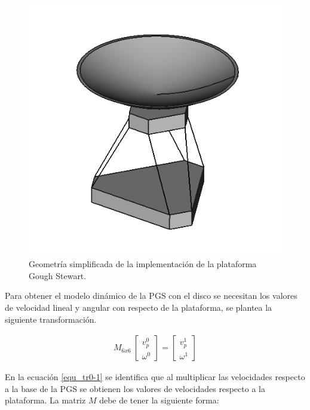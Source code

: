 \begin{figure}
 \centering
 \includegraphics[scale=0.6]{img/implementation.png}
 \caption{Geometría simplificada de la implementación de la plataforma Gough Stewart.}
 \label{fig: antenna}
\end{figure}


Para obtener el modelo dinámico de la PGS con el 
disco se necesitan los valores de velocidad lineal y 
angular con respecto de la plataforma, se plantea la 
siguiente transformación.

\begin{equation} \label{equ_tr0-1}
\begin{split}
M_{6x6}\
\begin{bmatrix}
v_p^0\\
\omega^0
\end{bmatrix}  = \begin{bmatrix}
v_p^1\\
\omega^1
\end{bmatrix}
\end{split}
\end{equation}

En la ecuación \ref{equ_tr0-1} se identifica que al 
multiplicar las velocidades respecto a la base de la PGS se 
obtienen los valores de velocidades respecto a la 
plataforma. La matriz $M$ debe de tener la siguiente forma:

